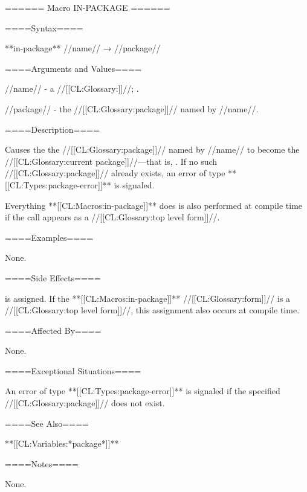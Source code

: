 ====== Macro IN-PACKAGE ======

====Syntax====

**in-package** //name// → //package//

====Arguments and Values====

//name// - a //[[CL:Glossary:\packagenamedesignator]]//; \noeval.

//package// - the //[[CL:Glossary:package]]// named by //name//.

====Description====

Causes the the //[[CL:Glossary:package]]// named by //name// to become the //[[CL:Glossary:current package]]//---that is, . If no such //[[CL:Glossary:package]]// already exists, an error of type **[[CL:Types:package-error]]** is signaled.

Everything **[[CL:Macros:in-package]]** does is also performed at compile time if the call appears as a //[[CL:Glossary:top level form]]//.

====Examples====

None.


====Side Effects====

 is assigned. If the **[[CL:Macros:in-package]]** //[[CL:Glossary:form]]// is a //[[CL:Glossary:top level form]]//, this assignment also occurs at compile time.

====Affected By====

None.

====Exceptional Situations====

An error of type **[[CL:Types:package-error]]** is signaled if the specified //[[CL:Glossary:package]]// does not exist.

====See Also====

**[[CL:Variables:*package*]]**

====Notes====

None.

